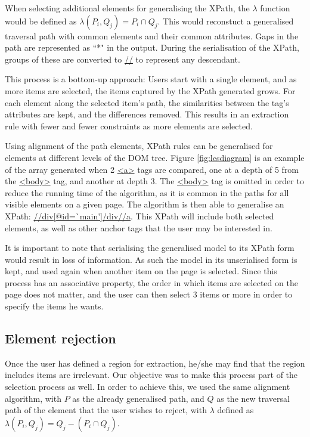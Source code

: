 When selecting additional elements for generalising the XPath, the $\lambda$ function would be
defined as $\lambda(P_i,Q_j) = P_i \cap Q_j$. This would reconstuct a generalised traversal
path with common elements and their common attributes. Gaps in the path are represented as ``*"
 in the output. During the serialisation of the XPath, groups of these are converted to
 \url{//} to represent any descendant.

This process is a bottom-up approach: Users start with a single element, and as more items are
selected, the items captured by the XPath generated grows. For each element along the selected
item's path, the similarities between the tag's attributes are kept, and the differences
removed. This results in an extraction rule with fewer and fewer constraints as more elements
are selected.



Using alignment of the path elements, XPath rules can be generalised for elements at different
levels of the DOM tree. Figure \ref{fig:lcsdiagram} is an example of the array generated when 2
\url{<a>} tags are compared, one at a depth of 5 from the \url{<body>} tag, and another at
depth 3. The \url{<body>} tag is omitted in order to reduce the running time of the algorithm,
as it is common in the paths for all visible elements on a given page. The algorithm is then
able to generalise an XPath: \url{//div[@id=`main']/div//a}. This XPath will include both
selected elements, as well as other anchor tags that the user may be interested in.




It is important to note that serialising the generalised model to its XPath form would result
in loss of information. As such the model in its unserialised form is kept, and used again when
another item on the page is selected. Since this process has an associative property, the order
in which items are selected on the page does not matter, and the user can then select 3 items
or more in order to specify the items he wants.

\subsection{Element rejection}

Once the user has defined a region for extraction, he/she may find that the region includes
items are irrelevant. Our objective was to make this process part of the selection process as
well. In order to achieve this, we used the same alignment algorithm, with $P$ as the already
generalised path, and $Q$ as the new traversal path of the element that the user wishes to
reject, with $\lambda$ defined as $\lambda(P_i,Q_j) = Q_j - (P_i \cap Q_j)$.


